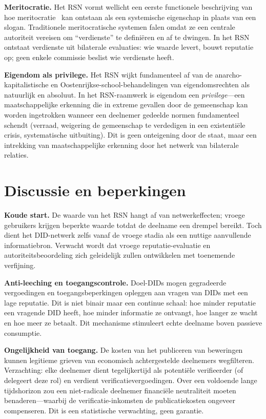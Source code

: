 \documentclass[11pt,a4paper,twocolumn]{article}
\begin{document}
\textbf{Meritocratie.} Het RSN vormt wellicht een eerste functionele beschrijving van hoe meritocratie~\cite{young1958} kan ontstaan als een systemische eigenschap in plaats van een slogan. Traditionele meritocratische systemen falen omdat ze een centrale autoriteit vereisen om ``verdienste'' te definiëren en af te dwingen. In het RSN ontstaat verdienste uit bilaterale evaluaties: wie waarde levert, bouwt reputatie op; geen enkele commissie beslist wie verdienste heeft.

\textbf{Eigendom als privilege.} Het RSN wijkt fundamenteel af van de anarcho-kapitalistische en Oostenrijkse-school-behandelingen van eigendomsrechten als natuurlijk en absoluut. In het RSN-raamwerk is eigendom een \emph{privilege}---een maatschappelijke erkenning die in extreme gevallen door de gemeenschap kan worden ingetrokken wanneer een deelnemer gedeelde normen fundamenteel schendt (verraad, weigering de gemeenschap te verdedigen in een existentiële crisis, systematische uitbuiting). Dit is geen onteigening door de staat, maar een intrekking van maatschappelijke erkenning door het netwerk van bilaterale relaties.

\section{Discussie en beperkingen}

\textbf{Koude start.} De waarde van het RSN hangt af van netwerkeffecten; vroege gebruikers krijgen beperkte waarde totdat de deelname een drempel bereikt. Toch dient het DID-netwerk zelfs vanaf de vroege stadia als een nuttige aanvullende informatiebron. Verwacht wordt dat vroege reputatie-evaluatie en autoriteitsbeoordeling zich geleidelijk zullen ontwikkelen met toenemende verfijning.

\textbf{Anti-leeching en toegangscontrole.} Doel-DIDs mogen gegradeerde vergoedingen en toegangsbeperkingen opleggen aan vragen van DIDs met een lage reputatie. Dit is niet binair maar een continue schaal: hoe minder reputatie een vragende DID heeft, hoe minder informatie ze ontvangt, hoe langer ze wacht en hoe meer ze betaalt. Dit mechanisme stimuleert echte deelname boven passieve consumptie.

\textbf{Ongelijkheid van toegang.} De kosten van het publiceren van beweringen kunnen legitieme grieven van economisch achtergestelde deelnemers wegfilteren. Verzachting: elke deelnemer dient tegelijkertijd als potentiële verifieerder (of delegeert deze rol) en verdient verificatievergoedingen. Over een voldoende lange tijdshorizon zou een niet-radicale deelnemer financiële neutraliteit moeten benaderen---waarbij de verificatie-inkomsten de publicatiekosten ongeveer compenseren. Dit is een statistische verwachting, geen garantie.
\end{document}
